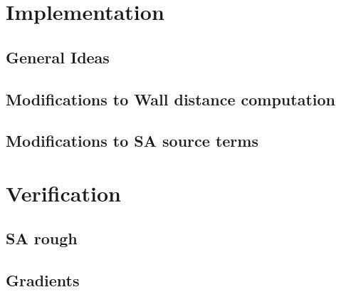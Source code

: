 \section{Implementation}

\subsection{General Ideas}

\subsection{Modifications to Wall distance computation}

\subsection{Modifications to SA source terms}

\section{Verification}

\subsection{SA rough}

\subsection{Gradients}
